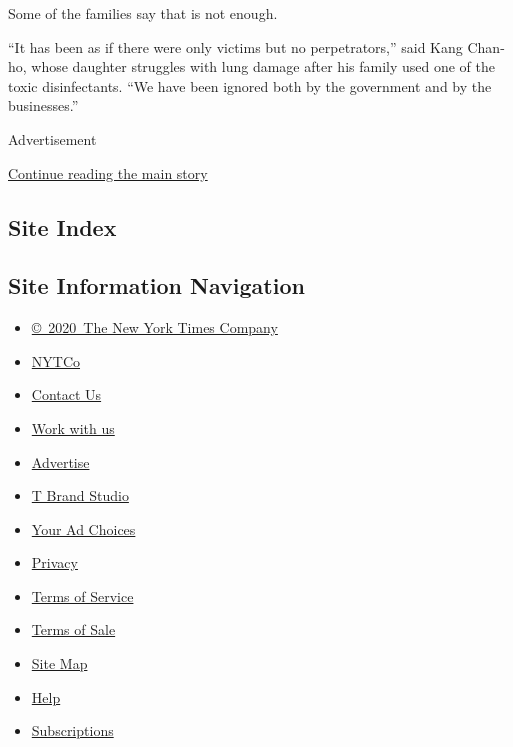 Some of the families say that is not enough.

``It has been as if there were only victims but no perpetrators,'' said
Kang Chan-ho, whose daughter struggles with lung damage after his family
used one of the toxic disinfectants. ``We have been ignored both by the
government and by the businesses.''

Advertisement

\protect\hyperlink{after-bottom}{Continue reading the main story}

\hypertarget{site-index}{%
\subsection{Site Index}\label{site-index}}

\hypertarget{site-information-navigation}{%
\subsection{Site Information
Navigation}\label{site-information-navigation}}

\begin{itemize}
\tightlist
\item
  \href{https://help.nytimes.com/hc/en-us/articles/115014792127-Copyright-notice}{©~2020~The
  New York Times Company}
\end{itemize}

\begin{itemize}
\tightlist
\item
  \href{https://www.nytco.com/}{NYTCo}
\item
  \href{https://help.nytimes.com/hc/en-us/articles/115015385887-Contact-Us}{Contact
  Us}
\item
  \href{https://www.nytco.com/careers/}{Work with us}
\item
  \href{https://nytmediakit.com/}{Advertise}
\item
  \href{http://www.tbrandstudio.com/}{T Brand Studio}
\item
  \href{https://www.nytimes.com/privacy/cookie-policy\#how-do-i-manage-trackers}{Your
  Ad Choices}
\item
  \href{https://www.nytimes.com/privacy}{Privacy}
\item
  \href{https://help.nytimes.com/hc/en-us/articles/115014893428-Terms-of-service}{Terms
  of Service}
\item
  \href{https://help.nytimes.com/hc/en-us/articles/115014893968-Terms-of-sale}{Terms
  of Sale}
\item
  \href{https://spiderbites.nytimes.com}{Site Map}
\item
  \href{https://help.nytimes.com/hc/en-us}{Help}
\item
  \href{https://www.nytimes.com/subscription?campaignId=37WXW}{Subscriptions}
\end{itemize}
